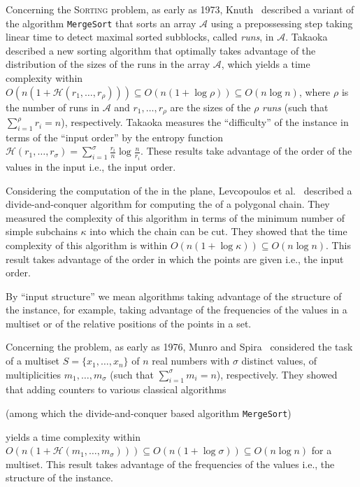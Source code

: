 Concerning the \textsc{Sorting} problem, as early as 1973,
Knuth~\cite{1973-BOOK-TheArtOfComputerProgrammingVol3-Knuth} described
a variant of the algorithm {\tt{MergeSort}} that sorts an array
$\mathcal{A}$ using a prepossessing step taking linear time to detect
maximal sorted subblocks, called \emph{runs}, in $\mathcal{A}$.
Takaoka~\cite{2009-Chapter-PartialSolutionAndEntropy-Takaoka}
described a new sorting algorithm that optimally takes advantage of
the distribution of the sizes of the runs in the array $\mathcal{A}$,
which yields a time complexity within
$O(n(1+\mathcal{H}(r_1, \dots, r_{\rho}))) \subseteq
O(n(1{+}\log{\rho})) \subseteq O(n\log{n})$, where $\rho$ is the
number of runs in $\mathcal{A}$ and $r_1, \dots, r_{\rho}$ are the
sizes of the $\rho$ \emph{runs} (such that $\sum_{i=1}^\rho {r_i}=n$),
respectively. Takaoka measures the ``difficulty'' of the instance in
terms of the ``input order'' by the entropy function
$\mathcal{H}(r_1, \dots, r_\sigma) =
\sum_{i=1}^\sigma{\frac{r_i}{n}}\log{\frac{n}{r_i}}$. These results
take advantage of the order of the values in the input i.e., the input
order.

Considering the computation of the {} in the plane,
Levcopoulos et
al.~\cite{2002-SWAT-AdaptiveAlgorithmsForConstructingConvexHullsAndTriangulationsOfPolygonalChains-LevcopoulosLingasMitchell}
described a divide-and-conquer algorithm for computing the {} of a polygonal chain. They measured the complexity of this
algorithm in terms of the minimum number of simple subchains $\kappa$
into which the chain can be cut.  They showed that the time complexity
of this algorithm is within
$O(n(1{+}\log{\kappa})) \subseteq O(n\log{n})$. This result takes
advantage of the order in which the points are given i.e., the input
order.

By ``input structure'' we mean algorithms taking advantage of the structure of the instance, for example, taking advantage of the frequencies of the values in a multiset or of the relative positions of the points in a set.

Concerning the {} problem, as early as 1976, Munro and
Spira~\cite{1976-JComp-SortingAndSearchingInMultisets-MunroSpira}
considered the task of {} a multiset
$S=\{x_1, \dots, x_n\}$ of $n$ real numbers with $\sigma$ distinct
values, of multiplicities $m_1, \dots, m_\sigma$ (such that
$\sum_{i=1}^\sigma {m_i}=n$), respectively. They showed that adding
counters to various classical algorithms
\begin{INUTILE}
  (among which the divide-and-conquer based algorithm
  {\tt{MergeSort}})
\end{INUTILE}
yields a time complexity within
$O(n(1+\mathcal{H}(m_1, \dots, m_\sigma))) \subseteq
O(n(1{+}\log{\sigma})) \subseteq O(n\log{n})$ for {} a
multiset. This result takes advantage of
the frequencies of the values i.e., the structure of the instance.

